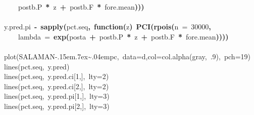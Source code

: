 \documentclass{article}
\makeatletter
\newcommand{\hlnumber}[1]{\textcolor[rgb]{0,0,0}{#1}}%
\newcommand{\hlfunctioncall}[1]{\textcolor[rgb]{.5,0,.33}{\textbf{#1}}}%
\newcommand{\hlkeyword}[1]{\textbf{#1}}%
\newcommand{\hlargument}[1]{\textcolor[rgb]{.69,.25,.02}{#1}}%
\newcommand{\hlcomment}[1]{\textcolor[rgb]{.18,.6,.34}{#1}}%
\newcommand{\hlformalargs}[1]{\hlargument{#1}}%
\newcommand{\hlassignement}[1]{\textbf{#1}}%
\newcommand{\hlsymbol}[1]{#1}%
\def\urltilda{\kern -.15em\lower .7ex\hbox{\~{}}\kern .04em}%
\newcommand{\hlstd}[1]{\textcolor[rgb]{0,0,0}{#1}}%
\newenvironment{kframe}{%
 \def\FrameCommand##1{\hskip\@totalleftmargin \hskip-\fboxsep
 \colorbox{shadecolor}{##1}\hskip-\fboxsep
     \hskip-\linewidth \hskip-\@totalleftmargin \hskip\columnwidth}%
 \MakeFramed {\advance\hsize-\width
   \@totalleftmargin\z@ \linewidth\hsize
   \@setminipage}}%
 {\par\unskip\endMakeFramed}
\newenvironment{knitrout}{}{} %
\makeatother
\begin{document}
\begin{knitrout}
{\begin{kframe}
\begin{flushleft}
\hlstd{}{\ }{\ }{\ }{\ }\hlsymbol{post}\hlkeyword{\usebox{\hlnormalsizeboxdollar}}\hlsymbol{b.P}{\ }\hlkeyword{*}{\ }\hlsymbol{z}{\ }\hlkeyword{+}{\ }\hlsymbol{post}\hlkeyword{\usebox{\hlnormalsizeboxdollar}}\hlsymbol{b.F}{\ }\hlkeyword{*}{\ }\hlsymbol{fore.mean}\hlkeyword{)}\hlkeyword{)}\hlkeyword{)}\hspace*{\fill}\\
\hlstd{}\hspace*{\fill}\\
\hlstd{}\hlsymbol{y.pred.pi}{\ }\hlassignement{\usebox{\hlnormalsizeboxlessthan}-}{\ }\hlfunctioncall{sapply}\hlkeyword{(}\hlsymbol{pct.seq}\hlkeyword{,}{\ }\hlkeyword{function}\hlkeyword{(}\hlformalargs{z}\hlkeyword{)}{\ }\hlfunctioncall{PCI}\hlkeyword{(}\hlfunctioncall{rpois}\hlkeyword{(}\hlargument{n}{\ }\hlargument{=}{\ }\hlnumber{30000}\hlkeyword{,}\hspace*{\fill}\\
\hlstd{}{\ }{\ }{\ }{\ }\hlargument{lambda}{\ }\hlargument{=}{\ }\hlfunctioncall{exp}\hlkeyword{(}\hlsymbol{post}\hlkeyword{\usebox{\hlnormalsizeboxdollar}}\hlsymbol{a}{\ }\hlkeyword{+}{\ }\hlsymbol{post}\hlkeyword{\usebox{\hlnormalsizeboxdollar}}\hlsymbol{b.P}{\ }\hlkeyword{*}{\ }\hlsymbol{z}{\ }\hlkeyword{+}{\ }\hlsymbol{post}\hlkeyword{\usebox{\hlnormalsizeboxdollar}}\hlsymbol{b.F}{\ }\hlkeyword{*}{\ }\hlsymbol{fore.mean}\hlkeyword{)}\hlkeyword{)}\hlkeyword{)}\hlkeyword{)}\hspace*{\fill}\\
\hlstd{}\hspace*{\fill}\\
\hlstd{}\hlcomment{\usebox{\hlnormalsizeboxhash}\usebox{\hlnormalsizeboxhash}{\ }plot(SALAMAN\urltilda{}pc,{\ }data=d,col=col.alpha(\usebox{\hlnormalsizeboxsinglequote}gray\usebox{\hlnormalsizeboxsinglequote},{\ }.9),{\ }pch=19)}\hspace*{\fill}\\
\hlstd{}\hlcomment{\usebox{\hlnormalsizeboxhash}\usebox{\hlnormalsizeboxhash}{\ }lines(pct.seq,{\ }y.pred)}\hspace*{\fill}\\
\hlstd{}\hlcomment{\usebox{\hlnormalsizeboxhash}\usebox{\hlnormalsizeboxhash}{\ }lines(pct.seq,{\ }y.pred.ci[1,],{\ }lty=2)}\hspace*{\fill}\\
\hlstd{}\hlcomment{\usebox{\hlnormalsizeboxhash}\usebox{\hlnormalsizeboxhash}{\ }lines(pct.seq,{\ }y.pred.ci[2,],{\ }lty=2)}\hspace*{\fill}\\
\hlstd{}\hlcomment{\usebox{\hlnormalsizeboxhash}\usebox{\hlnormalsizeboxhash}{\ }lines(pct.seq,{\ }y.pred.pi[1,],{\ }lty=3)}\hspace*{\fill}\\
\hlstd{}\hlcomment{\usebox{\hlnormalsizeboxhash}\usebox{\hlnormalsizeboxhash}{\ }lines(pct.seq,{\ }y.pred.pi[2,],{\ }lty=3)}\mbox{}
\normalfont
\end{flushleft}
\end{kframe}}
\end{knitrout}
\end{document}
